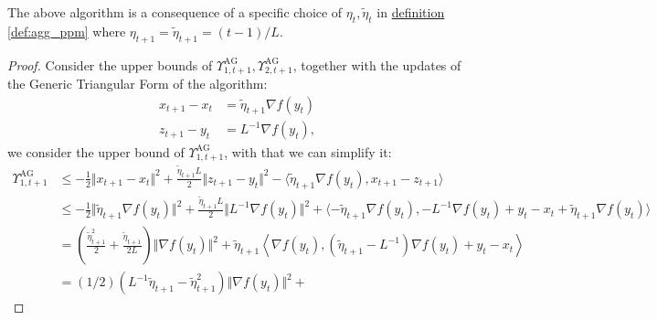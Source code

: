 \documentclass[12pt]{article}
\begin{document}
        
        \begin{proposition}
            The above algorithm is a consequence of a specific choice of $\eta_t, \tilde \eta_t$ in \hyperref[def:agg_ppm]{definition \ref*{def:agg_ppm}} where $\eta_{t + 1} = \tilde \eta_{t + 1} = (t - 1)/L$.     
        \end{proposition}
        \begin{proof}
            Consider the upper bounds of $\Upsilon_{1, t + 1}^\text{AG}, \Upsilon_{2, t + 1}^\text{AG}$, together with the updates of the Generic Triangular Form of the algorithm:  
            \begin{align*}
                x_{t + 1} - x_t &= \tilde \eta_{t + 1}\nabla f(y_t)
                \\
                z_{t +1} - y_t &= L^{-1}\nabla f(y_t), 
            \end{align*}
            we consider the upper bound of $\Upsilon_{1, t + 1}^{\text{AG}}$, with that we can simplify it: 
            {\footnotesize
            \begin{align*}
                \Upsilon_{1, t + 1}^{\text{AG}}
                &\le 
                -\frac{1}{2}\Vert x_{t + 1} - x_t\Vert^2 
                + 
                \frac{\tilde \eta_{t + 1}L }{2} \Vert z_{t + 1} - y_t\Vert^2 
                - 
                \langle \tilde \eta_{t + 1} \nabla f(y_t), x_{t +1} - z_{t + 1}\rangle
                \\
                &\le 
                - \frac{1}{2}\Vert \tilde \eta_{t + 1} \nabla f(y_t)\Vert^2 
                + \frac{\tilde \eta_{t + 1} L}{2}\Vert L^{-1} \nabla f(y_t)\Vert^2 
                + 
                \langle 
                    - \tilde \eta_{t + 1} \nabla f(y_t), 
                    -L^{-1}\nabla f(y_t) + y_t - x_t + \tilde \eta_{t + 1}\nabla f(y_t)
                \rangle
                \\
                &= 
                \left(
                    \frac{\tilde \eta_{t + 1}^2}{2} + 
                    \frac{\tilde \eta_{t + 1}}{2L}
                \right)
                \Vert \nabla f(y_t)\Vert^2 
                + \tilde \eta_{t + 1} 
                \left\langle 
                    \nabla f(y_t), 
                    (\tilde \eta_{t + 1} - L^{-1})\nabla f(y_t) + y_t - x_t 
                \right\rangle
                \\
                &= 
                (1/2)(L^{-1}\tilde \eta_{t + 1} - \tilde \eta_{t + 1}^2)
                \Vert \nabla f(y_t)\Vert^2
                + 

\end{align*}}
\end{proof}
\end{document}

